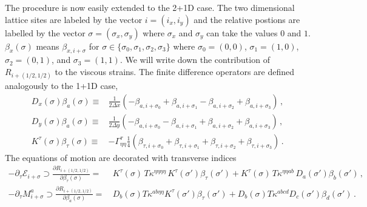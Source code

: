 \documentclass[12pt,aps,preprint,nofootinbib,noshowkeys,noshowpacs,longbibliography,superscriptaddress,tightenlines]{revtex4-2}
\def\edense{{\mathcal{E}}}
\def\pdense{M}
\def\Kd{{K^\tau}}
\begin{document}
The procedure is now easily extended to the 2+1D case.  The two dimensional 
lattice sites are labeled by the vector $i=(i_x, i_y)$  
and the relative postions are labelled by the vector $\sigma = (\sigma_x, \sigma_y)$ where $\sigma_x$ and $\sigma_y$ can take the values $0$ and $1$.  
$\beta_x(\sigma)$ means $\beta_{x, i+\sigma}$ for 
$\sigma \in \{ \sigma_0, \sigma_1, \sigma_2, \sigma_3\}$ where $\sigma_0 = (0,0)$, $\sigma_1 = (1,0)$, $\sigma_2 = (0,1)$, and $\sigma_3 = (1,1)$.  
We will write down the contribution of $R_{i+(1/2, 1/2)}$ to the viscous strains. 
 The finite difference operators are defined analogously to the 1+1D case,
\begin{subequations}
\begin{align}
  D_x(\sigma)\beta_a(\sigma) \equiv & \frac{1}{2\Delta x} (-\beta_{a, i+\sigma_0} + \beta_{a, i+\sigma_1} - \beta_{a, i+\sigma_2} + \beta_{a, i+\sigma_3}) \, ,  \\
  D_y(\sigma)\beta_a(\sigma) \equiv & \frac{1}{2\Delta y} (-\beta_{a, i+\sigma_0} - \beta_{a, i+\sigma_1} + \beta_{a, i+\sigma_2} + \beta_{a, i+\sigma_3}) \, , \\ 
   K^\tau(\sigma) \beta_\tau(\sigma) \equiv & -\Gamma^\tau_{\eta\eta} \frac{1}{4} (\beta_{\tau, i+\sigma_0} + \beta_{\tau, i+\sigma_1} + \beta_{\tau, i+\sigma_2} + \beta_{\tau, i+\sigma_3}) \, .
\end{align}
\end{subequations}
The equations of motion are decorated with transverse indices 
\begin{subequations}
\label{eq:gofVdetail2d}
\begin{align}
     -\partial_\tau \edense_{i+\sigma}  \supset \frac{\partial R_{i+(1/2, 1/2)}}{\partial \beta_\tau(\sigma)} =&  \,   
    \Kd(\sigma) \, T\kappa^{\eta\eta\eta\eta} \, \Kd(\sigma')\beta_\tau(\sigma') 
     + \Kd(\sigma) \, T\kappa^{\eta\eta ab} \, D_a(\sigma')\beta_b(\sigma')  \, ,  \\
   -\partial_\tau \pdense_{i+\sigma}^a \supset \frac{\partial R_{i+(1/2, 1/2)}}{\partial \beta_a(\sigma)} =& \,   
     D_b(\sigma) T\kappa^{a b \eta\eta} \Kd(\sigma')\beta_\tau(\sigma') + D_b(\sigma) T\kappa^{abcd} D_{c} (\sigma') \beta_d(\sigma') \, .
\end{align}
\end{subequations}
\end{document}
